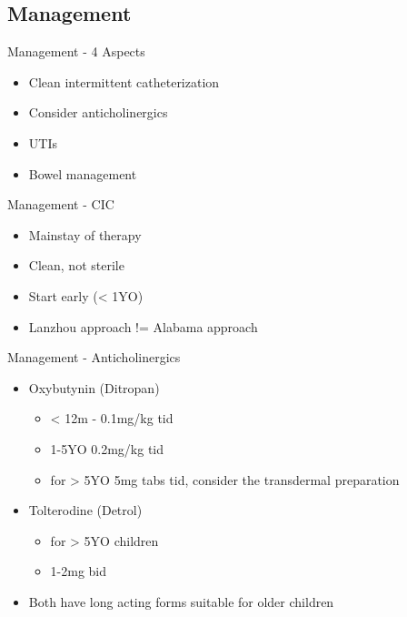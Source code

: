 \subsection{Management}\label{management-2}

\begin{frame}{Management - 4 Aspects}

\begin{itemize}
\itemsep1pt\parskip0pt
\item
  Clean intermittent catheterization
\item
  Consider anticholinergics
\item
  UTIs
\item
  Bowel management
\end{itemize}

\end{frame}

\begin{frame}{Management - CIC}

\begin{itemize}
\itemsep1pt\parskip0pt
\item
  Mainstay of therapy
\item
  Clean, not sterile
\item
  Start early (\textless{} 1YO)
\item
  Lanzhou approach != Alabama approach
\end{itemize}

\end{frame}

\begin{frame}{Management - Anticholinergics}

\begin{itemize}
\itemsep1pt\parskip0pt
\item
  Oxybutynin (Ditropan)

  \begin{itemize}
  \itemsep1pt\parskip0pt
  \item
    \textless{} 12m - 0.1mg/kg tid
  \item
    1-5YO 0.2mg/kg tid
  \item
    for \textgreater{} 5YO 5mg tabs tid, consider the transdermal
    preparation
  \end{itemize}
\item
  Tolterodine (Detrol)

  \begin{itemize}
  \itemsep1pt\parskip0pt
  \item
    for \textgreater{} 5YO children
  \item
    1-2mg bid
  \end{itemize}
\item
  Both have long acting forms suitable for older children
\end{itemize}

\end{frame}

